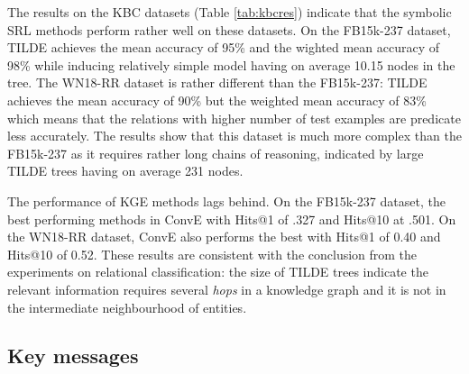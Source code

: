 The results on the KBC datasets (Table \ref{tab:kbcres}) indicate that the symbolic SRL methods perform rather well on these datasets.
On the FB15k-237 dataset, TILDE achieves the mean accuracy of 95\% and the wighted mean accuracy of 98\% while inducing relatively simple model having on average 10.15 nodes in the tree.
The WN18-RR dataset is rather different than the FB15k-237: TILDE achieves the mean accuracy of 90\% but the weighted mean accuracy of 83\% which means that the relations with higher number of test examples are predicate less accurately.
The results show that this dataset is much more complex than the FB15k-237 as it requires rather long chains of reasoning, indicated by large TILDE trees having on average 231 nodes.


The performance of KGE methods lags behind.
On the FB15k-237 dataset, the best performing methods in ConvE with Hits@1 of .327 and Hits@10 at .501.
On the WN18-RR dataset, ConvE also performs the best with Hits@1 of 0.40 and Hits@10 of 0.52.
These results are consistent with the conclusion from the experiments on relational classification: the size of TILDE trees indicate the relevant information requires several \textit{hops} in a knowledge graph and it is not in the intermediate neighbourhood of entities.





\subsection{Key messages}


